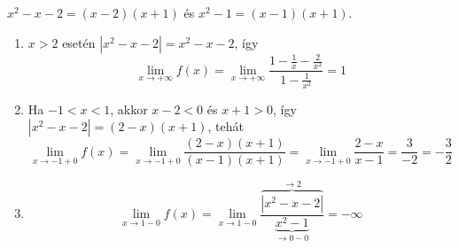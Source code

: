 \documentclass[11pt]{scrartcl}
\begin{document}
$x^2 - x - 2 = (x - 2)(x + 1)$ és $x^2 - 1 = (x - 1)(x + 1)$.
\begin{enumerate}
	\item $x > 2$ esetén $|x^2 - x - 2| = x^2 - x - 2$, így
	      \[
		      \lim_{x \to +\infty} f(x)
		      = \lim_{x \to +\infty}
		      \frac{1 - \frac{1}{x} - \frac{2}{x^2}}{1 - \frac{1}{x^2}}
		      = 1
	      \]

	\item Ha $-1 < x < 1$, akkor $x - 2 < 0$ és $x + 1 > 0$, így
	      $|x^2 - x - 2| = (2 - x)(x + 1)$, tehát
	      \[
		      \lim_{x \to -1 + 0} f(x)
		      = \lim_{x \to -1 + 0} \frac{(2 - x)(x + 1)}{(x - 1)(x + 1)}
		      = \lim_{x \to -1 + 0} \frac{2 - x}{x - 1}
		      = \frac{3}{-2}
		      = -\frac{3}{2}
	      \]

	\item \[
		      \lim_{x \to 1 - 0} f(x)
		      = \lim_{x \to 1 - 0}
		      \frac{\overbrace{|x^2 - x - 2|}^{\to 2}}{\underbrace{x^2 - 1}_{\to 0 - 0}}
		      = -\infty
	      \]
\end{enumerate}
\end{document}

